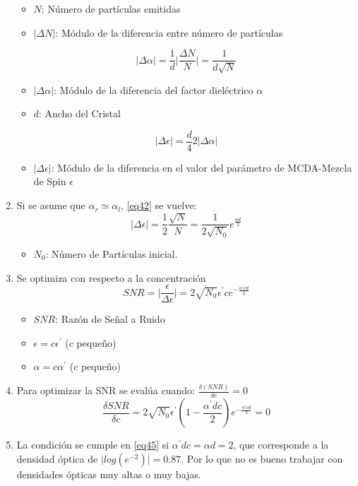 \documentclass[aps,rmp,reprint,longbibliography]{revtex4-1}
\begin{document}
\begin{enumerate}
\begin{itemize}
    \item $N$: Número de partículas emitidas
    \item $\lvert\Delta N\rvert$: Módulo de la diferencia entre número de partículas
\end{itemize}
\begin{equation}\label{eq41}\lvert\Delta \alpha\rvert=\frac{1}{d}\lvert\frac{\Delta N}{N}\rvert=\frac{1}{d\sqrt{N}} \end{equation}
\begin{itemize}
    \item $\lvert\Delta\alpha\rvert$: Módulo de la diferencia del factor dieléctrico $\alpha$
    \item $d$: Ancho del Cristal
\end{itemize}
\begin{equation}\label{eq42}\lvert\Delta \epsilon\rvert= \frac{d}{4}2\lvert\Delta\alpha\rvert \end{equation}
\begin{itemize}
    \item $\lvert\Delta\epsilon\rvert$: Módulo de la diferencia en el valor del parámetro de MCDA-Mezcla de Spin $\epsilon$
\end{itemize}
\item Si se asume que $\alpha_r\simeq\alpha_l$, \ref{eq42} se vuelve:
\begin{equation}\label{eq43}\lvert\Delta\epsilon\rvert=\frac{1}{2}\frac{\sqrt{N}}{N}=\frac{1}{2\sqrt{N_0}}e^{\frac{\alpha d}{2}}\end{equation}
\begin{itemize}
    \item $N_0$: Número de Partículas inicial.
\end{itemize}
\item Se optimiza con respecto a la concentración
\begin{equation}\label{eq44}SNR=\lvert\frac{\epsilon}{\Delta\epsilon}\rvert=2\sqrt{N_0}\epsilon^\prime c e^{-\frac{\alpha^\prime cd}{2}}\end{equation}
\begin{itemize}
    \item $SNR$: Razón de Señal a Ruido
    \item $\epsilon=c\epsilon^\prime$ ($c$ pequeño)
    \item $\alpha=c\alpha^\prime$ ($c$ pequeño)
\end{itemize}
\item Para optimizar la SNR se evalúa cuando: $\frac{\delta(SNR)}{\delta c}=0$
\begin{equation}\label{eq45}\frac{\delta SNR}{\delta c}=2\sqrt{N_0}\epsilon^\prime(1-\frac{\alpha^\prime dc}{2})e^{-\frac{\alpha^\prime cd}{2}}=0\end{equation}
\item La condición se cumple en \ref{eq45} si $\alpha^\prime dc=\alpha d =2$, que corresponde a la densidad óptica de $\lvert log(e^{-2})\rvert = 0.87$. Por lo que no es bueno trabajar con densidades ópticas muy altas o muy bajas. 
\end{enumerate}
\end{document}
